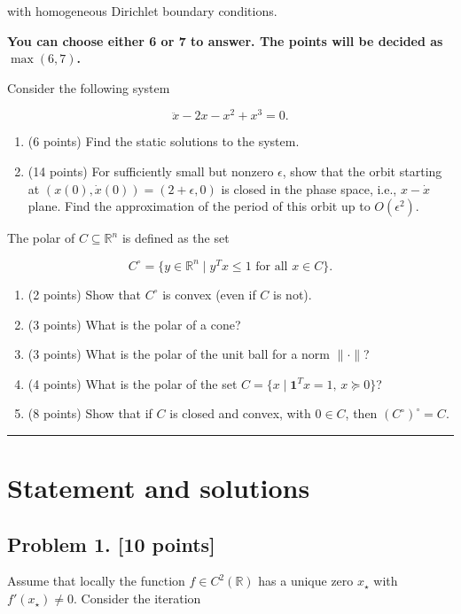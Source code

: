 \documentclass[11pt,a4paper]{article}
\newcommand{\examstatement}[1]{%
  \par\addvspace{0.85em}%
  \noindent{\bfseries #1}\par\nobreak\addvspace{0.28em}%
}
\begin{document}
with homogeneous Dirichlet boundary conditions.

\noindent\textbf{You can choose either 6 or 7 to answer. The points will be decided as \(\max(6, 7)\).}

\examstatement{Problem 6. [20 points]}
Consider the following system

\[
\ddot{x} - 2x - x^{2} + x^{3} = 0.
\]

\begin{enumerate}[label=(\alph*)]
    \item (6 points) Find the static solutions to the system.
    \item (14 points) For sufficiently small but nonzero \(\epsilon\), show that the orbit starting at \((x(0), \dot{x}(0)) = (2 + \epsilon, 0)\) is closed in the phase space, i.e., \(x - \dot{x}\) plane. Find the approximation of the period of this orbit up to \(O(\epsilon^{2})\).
\end{enumerate}

\examstatement{Problem 7. [20 points]}
The polar of \(C \subseteq \mathbb{R}^{n}\) is defined as the set

\[
C^{\circ} = \bigl\{ y \in \mathbb{R}^{n} \mid y^{T} x \le 1 \text{ for all } x \in C \bigr\}.
\]

\begin{enumerate}[label=(\alph*)]
    \item (2 points) Show that \(C^{\circ}\) is convex (even if \(C\) is not).
    \item (3 points) What is the polar of a cone?
    \item (3 points) What is the polar of the unit ball for a norm \(\|\cdot\|\)?
    \item (4 points) What is the polar of the set \(C = \{ x \mid \mathbf{1}^{T} x = 1,\, x \succeq 0 \}\)?
    \item (8 points) Show that if \(C\) is closed and convex, with \(0 \in C\), then \((C^{\circ})^{\circ} = C\).
\end{enumerate}

\noindent\rule{\linewidth}{0.4pt}

\section{Statement and solutions}

\subsection{Problem 1. [10 points]}
Assume that locally the function \(f \in C^{2}(\mathbb{R})\) has a unique zero \(x_{\star}\) with \(f'(x_{\star}) \neq 0\). Consider the iteration
\end{document}
